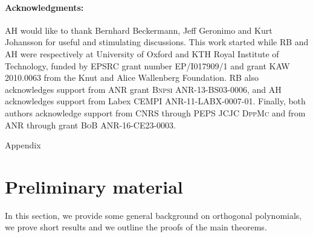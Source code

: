 \documentclass[a4paper,11pt]{article}
\numberwithin{equation}{section}
\theoremstyle{definition}
\newcommand{\rev}[1]{#1}
\begin{document}




\paragraph{Acknowledgments:} AH would like to thank Bernhard
Beckermann, Jeff Geronimo and  Kurt Johansson for useful and stimulating discussions. This work
started while RB and AH were respectively at University of Oxford and KTH Royal Institute of Technology,
funded by EPSRC grant number EP/I017909/1 and grant KAW 2010.0063
from the Knut and Alice Wallenberg Foundation. RB also acknowledges support from
ANR grant \textsc{Bnpsi} ANR-13-BS03-0006, and AH acknowledges support from Labex CEMPI ANR-11-LABX-0007-01. Finally, both authors acknowledge support
from CNRS through PEPS JCJC \textsc{DppMc} and from ANR through grant
\textsc{BoB} ANR-16-CE23-0003.






\appendix

\newpage

\begin{center}
\Huge{Appendix}
\end{center}



\section{Preliminary material}
\label{s:outlineOfProofs}

In this section, we provide some general background on orthogonal polynomials, \rev{we prove short results and we outline the proofs of the main theorems.}
\end{document}
